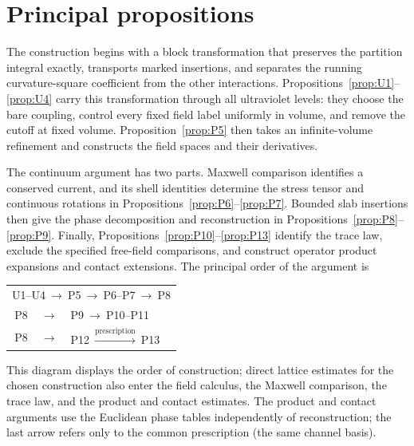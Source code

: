 \section{Principal propositions}\label{sec:principal-propositions}

The construction begins with a block transformation that preserves the partition
integral exactly, transports marked insertions, and separates the running
curvature-square coefficient from the other interactions.
Propositions~\ref{prop:U1}--\ref{prop:U4} carry this
transformation through all ultraviolet levels: they choose the bare coupling,
control every fixed field label uniformly in volume, and remove the cutoff at
fixed volume. Proposition~\ref{prop:P5} then takes an infinite-volume refinement
and constructs the field spaces and their derivatives.

The continuum argument has two parts. Maxwell comparison identifies a conserved
current, and its shell identities determine the stress tensor and continuous
rotations in Propositions~\ref{prop:P6}--\ref{prop:P7}. Bounded slab insertions
then give the phase decomposition and reconstruction in
Propositions~\ref{prop:P8}--\ref{prop:P9}. Finally,
Propositions~\ref{prop:P10}--\ref{prop:P13} identify the trace law, exclude the
specified free-field comparisons, and construct operator product expansions and
contact extensions. The principal order of the argument is
\begin{center}
\begin{tabular}{r@{\quad}c@{\quad}l}
\multicolumn{3}{c}{\textup{U1--U4}$\ \longrightarrow\ $\textup{P5}$\ \longrightarrow\ $\textup{P6--P7}$\ \longrightarrow\ $\textup{P8}} \\[2pt]
\textup{P8} & $\longrightarrow$ & \textup{P9}$\ \longrightarrow\ $\textup{P10--P11} \\[2pt]
\textup{P8} & $\longrightarrow$ & \textup{P12}$\ \xrightarrow{\text{prescription}}\ $\textup{P13}
\end{tabular}
\end{center}
This diagram displays the order of construction; direct lattice estimates for
the chosen construction also enter the field calculus, the Maxwell comparison,
the trace law, and the product and contact estimates. The product and contact
arguments use the Euclidean phase tables independently of reconstruction;
the last arrow refers only to the common prescription (the same channel basis).

